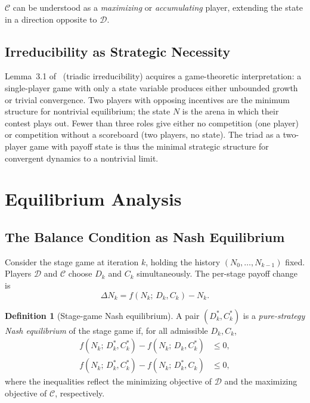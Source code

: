 \documentclass[12pt]{article}
\theoremstyle{definition}
\newtheorem{definition}[theorem]{Definition}
\theoremstyle{remark}
\begin{document}
$\mathcal{C}$ can be understood as a \emph{maximizing} or \emph{accumulating} player,
extending the state in a direction opposite to $\mathcal{D}$.

\subsection{Irreducibility as Strategic Necessity}

Lemma~3.1 of~\cite{Mil26a} (triadic irreducibility) acquires a game-theoretic
interpretation: a single-player game with only a state variable produces either
unbounded growth or trivial convergence.  Two players with opposing incentives are the
minimum structure for nontrivial equilibrium; the state $N$ is the arena in which their
contest plays out.  Fewer than three roles give either no competition (one player) or
competition without a scoreboard (two players, no state).  The triad as a two-player
game with payoff state is thus the minimal strategic structure for convergent dynamics to
a nontrivial limit.

\section{Equilibrium Analysis}
\label{sec:equilibrium}

\subsection{The Balance Condition as Nash Equilibrium}

Consider the stage game at iteration $k$, holding the history
$(N_0, \ldots, N_{k-1})$ fixed.  Players $\mathcal{D}$ and $\mathcal{C}$ choose
$D_k$ and $C_k$ simultaneously.  The per-stage payoff change is
\[
  \Delta N_k = f(N_k;\, D_k, C_k) - N_k.
\]

\begin{definition}[Stage-game Nash equilibrium]
\label{def:nash}
A pair $(D_k^*, C_k^*)$ is a \emph{pure-strategy Nash equilibrium} of the stage game
if, for all admissible $D_k, C_k$,
\begin{align}
  f(N_k;\, D_k^*, C_k^*) - f(N_k;\, D_k,    C_k^*) &\leq 0, \label{eq:nashD}\\
  f(N_k;\, D_k^*, C_k^*) - f(N_k;\, D_k^*,  C_k  ) &\leq 0, \label{eq:nashC}
\end{align}
where the inequalities reflect the minimizing objective of $\mathcal{D}$ and the
maximizing objective of $\mathcal{C}$, respectively.
\end{definition}
\end{document}

